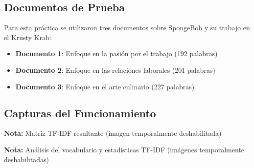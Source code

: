 \documentclass[12pt,a4paper]{article}
\begin{document}
\subsection{Documentos de Prueba}

Para esta práctica se utilizaron tres documentos sobre SpongeBob y su trabajo en el Krusty Krab:

\begin{itemize}
    \item \textbf{Documento 1}: Enfoque en la pasión por el trabajo (192 palabras)
    \item \textbf{Documento 2}: Enfoque en las relaciones laborales (201 palabras)
    \item \textbf{Documento 3}: Enfoque en el arte culinario (227 palabras)
\end{itemize}

\subsection{Capturas del Funcionamiento}


\textbf{Nota:} Matriz TF-IDF resultante (imagen temporalmente deshabilitada)


\textbf{Nota:} Análisis del vocabulario y estadísticas TF-IDF (imágenes temporalmente deshabilitadas)

\end{document}
